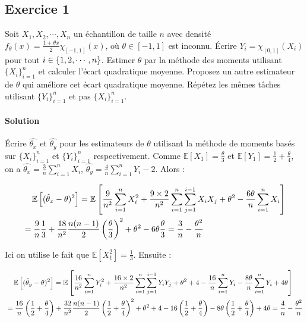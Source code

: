\documentclass[../main.tex]{subfiles}
\begin{document}
\begin{CJK*}{UTF8}{gbsn}

\section*{Exercice 1}

Soit $X_1, X_2, \cdots, X_n$ un échantillon de taille $n$ avec densité 
$f_{\theta}(x) = \frac{1 + \theta x}{2} \chi_{[-1,1]}(x)$, 
où $\theta \in [-1,1]$ est inconnu. Écrire $Y_i = \chi_{[0,1]}(X_i)$
pour tout $i \in \curly{ 1, 2, \cdots, n}$.
Estimer $\theta$ par la méthode des moments utilisant $\{X_i\}_{i=1}^n$ et 
calculer l'écart quadratique moyenne. 
Proposez un autre estimateur de $\theta$ qui améliore cet écart quadratique moyenne.
Répétez les mêmes tâches utilisant $\{Y_i\}_{i=1}^n$ et pas $\{X_i\}_{i=1}^n$.

\paragraph{Solution}

Écrire $\hat{\theta_x}$ et $\hat{\theta_y}$ 
pour les estimateurs de $\theta$ utilisant la méthode de moments 
basés sur $\{X_i\}_{i=1}^n$ et $\{Y_i\}_{i=1}^n$ respectivement.
Comme $\mathbb{E}[X_1] = \frac{\theta}{3}$
et $\mathbb{E}[Y_1] = \frac{1}{2} + \frac{\theta}{4}$,
on a $\hat{\theta_x} = \frac{3}{n}\sum_{i=1}^{n}X_i$, $\hat{\theta_y} = \frac{4}{n}\sum_{i=1}^{n}Y_i - 2$.
Alors :

\begin{equation*}
    \begin{split}
    &\tab[0.4cm] \mathbb{E} \squared{(\hat{\theta}_x-\theta)^2} = 
    \mathbb{E} \squared{\frac{9}{n^2} \sum_{i=1}^n X_i^2 + 
    \frac{9\times 2}{n^2} \sum_{i=1}^n \sum_{j=1}^{i-1} X_i X_j + \theta^2 - \frac{6\theta }{n} \sum_{i=1}^n X_i}
    \\ & = \frac{9}{n} \frac{1}{3} + \frac{18}{n^2} \frac{n(n-1)}{2} 
    \bracket{\frac{\theta}{3}}^2 + \theta^2 - 6 \theta \frac{\theta}{3} = \frac{3}{n} - \frac{\theta^2}{n}
    \end{split}
\end{equation*}

Ici on utilise le fait que $\mathbb{E}[X_1^2] = \frac{1}{3}$. Ensuite :

\begin{equation*}
    \begin{split}
    &\tab[0.4cm] \mathbb{E} \squared{(\hat{\theta}_y-\theta)^2} = 
    \mathbb{E} \squared{\frac{16}{n^2} \sum_{i=1}^n Y_i^2 + 
    \frac{16\times 2}{n^2} \sum_{i=1}^n \sum_{j=1}^{i-1} Y_i Y_j + \theta^2 + 4 - \frac{16}{n} \sum_{i=1}^n Y_i -  \frac{8\theta}{n} \sum_{i=1}^n Y_i + 4 \theta}
    \\ & = 
    \frac{16}{n}\bracket{\frac{1}{2} + \frac{\theta}{4}} + \frac{32}{n^2} \frac{n(n-1)}{2} \bracket{\frac{1}{2} + \frac{\theta}{4}}^2
    + \theta^2 + 4 - 16 \bracket{\frac{1}{2} + \frac{\theta}{4}} -  8\theta \bracket{\frac{1}{2} + \frac{\theta}{4}} + 4 \theta
    = \frac{4}{n} - \frac{\theta^2}{n}
    \end{split}
\end{equation*}


\end{CJK*}
\end{document}
